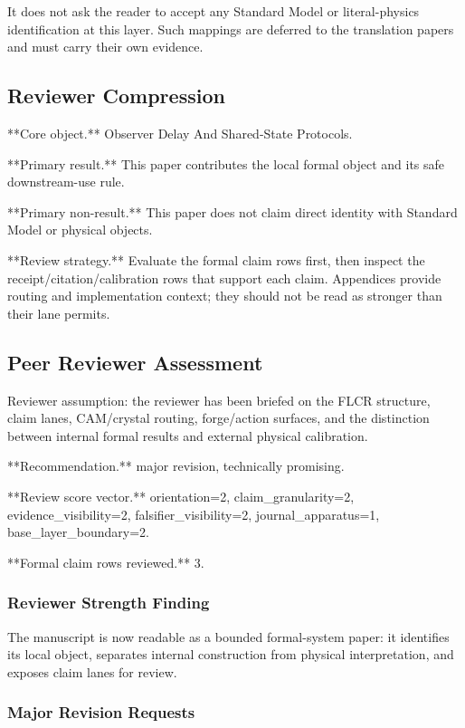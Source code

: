 \documentclass[11pt]{article}
\begin{document}
It does not ask the reader to accept any Standard Model or literal-physics identification at this layer. Such mappings are deferred to the translation papers and must carry their own evidence.

\subsection*{Reviewer Compression}

**Core object.** Observer Delay And Shared-State Protocols.

**Primary result.** This paper contributes the local formal object and its safe downstream-use rule.

**Primary non-result.** This paper does not claim direct identity with Standard Model or physical objects.

**Review strategy.** Evaluate the formal claim rows first, then inspect the receipt/citation/calibration rows that support each claim. Appendices provide routing and implementation context; they should not be read as stronger than their lane permits.

\subsection*{Peer Reviewer Assessment}

Reviewer assumption: the reviewer has been briefed on the FLCR structure, claim lanes, CAM/crystal routing, forge/action surfaces, and the distinction between internal formal results and external physical calibration.

**Recommendation.** major revision, technically promising.

**Review score vector.** orientation=2, claim\_granularity=2, evidence\_visibility=2, falsifier\_visibility=2, journal\_apparatus=1, base\_layer\_boundary=2.

**Formal claim rows reviewed.** 3.

\subsubsection*{Reviewer Strength Finding}

The manuscript is now readable as a bounded formal-system paper: it identifies its local object, separates internal construction from physical interpretation, and exposes claim lanes for review.

\subsubsection*{Major Revision Requests}
\end{document}
